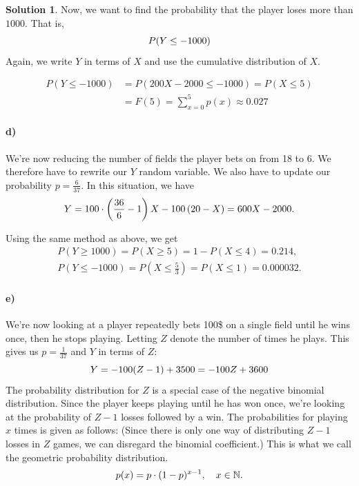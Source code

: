 \documentclass[a4paper]{article}
\theoremstyle{definition}
\newtheorem{sol}{Solution}
\begin{document}
\begin{sol}
Now, we want to find the probability that the player loses more than $1000$.
That is, 
\begin{equation}
  \notag
  P(Y \leq -1000)
\end{equation}
Again, we write $Y$ in terms of $X$ and use the cumulative distribution of $X$.

\begin{align*}
  P(Y \leq -1000) &= P(200X - 2000 \leq -1000) = P(X \leq 5) \\
  &= F(5) = \sum_{x=0}^{5}p(x) \approx  0.027
\end{align*}

\paragraph{d)}

We're now reducing the number of fields the player bets on from 18 to 6. We
therefore have to rewrite our $Y$ random variable.  We also have to update our
probability $p = \frac{6}{37}$.  In this situation, we have
\begin{equation}
  \notag
  Y = 100\cdot\left( \frac{36}{6} - 1\right)X - 100\left( 20-X \right) = 600X - 2000.
\end{equation}

Using the same method as above, we get 
\begin{align*}
  \label{eq:}
  P(Y \geq 1000) = P(X \geq 5) = 1 - P(X \leq 4) = 0.214, \\
  P(Y \leq -1000) = P(X \leq \frac{5}{3}) = P(X \leq 1) = 0.000032.
\end{align*}

\paragraph{e)}
We're now looking at a player repeatedly bets 100\$ on a single field until he
wins once, then he stops playing. Letting $Z$ denote the number of times he
plays. This gives us $p = \frac{1}{37}$ and $Y$ in terms of $Z$:
\begin{equation}
  \notag
  Y = -100(Z - 1) + 3500 = -100Z + 3600
\end{equation}
The probability distribution for $Z$ is a special case of the negative binomial
distribution.  Since the player keeps playing until he has won once, we're
looking at the probability of $Z - 1$ losses followed by a win.  The
probabilities for playing $x$ times is given as follows: (Since there is only
one way of distributing $Z-1$ losses in $Z$ games, we can disregard the
binomial coefficient.) This is what we call the geometric probability
distribution.
\begin{equation}
  \notag
  p(x) = p\cdot(1-p)^{x-1}, \quad x \in \mathbb{N}.
\end{equation}


\end{sol}
\end{document}
